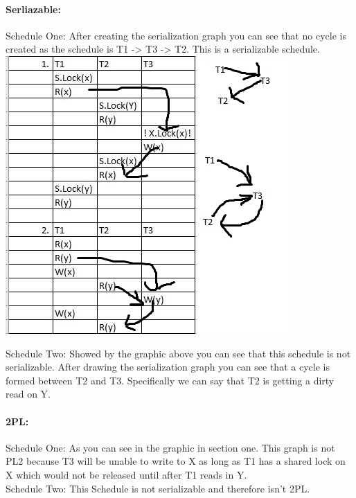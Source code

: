 \documentclass[11pt]{article}
\begin{document}
\paragraph{Serliazable:} \hfill \break
Schedule One:
After creating the serialization graph you can see that no cycle is created as the schedule is T1 -> T3 -> T2. This is a serializable schedule.\\

\includegraphics{Schedule.JPG}


Schedule Two: Showed by the graphic above you can see that this schedule is not serializable. After drawing the serialization graph you can see that a cycle is formed between T2 and T3. Specifically we can say that T2 is getting a dirty read on Y.\\

\paragraph{2PL:} \hfill \break
Schedule One: As you can see in the graphic in section one. This graph is not PL2 because T3 will be unable to write to X as long as T1 has a shared lock on X which would not be released until after T1 reads in Y.\\

Schedule Two: This Schedule is not serializable and therefore isn't 2PL.\\
\end{document}
